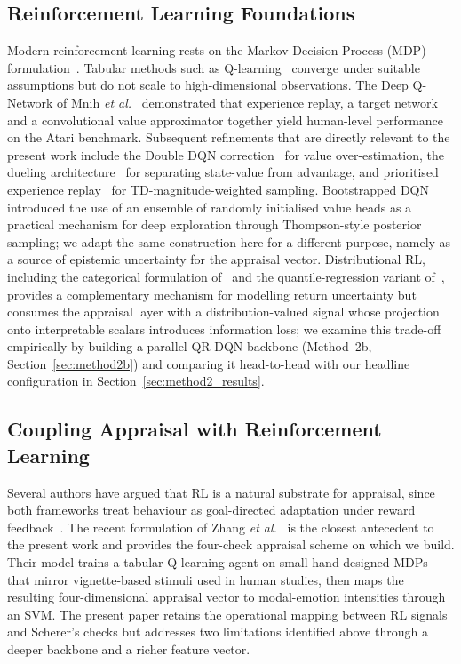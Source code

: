 \documentclass[conference]{IEEEtran}
\begin{document}
\subsection{Reinforcement Learning Foundations}
Modern reinforcement learning rests on the Markov Decision Process (MDP)
formulation~\cite{sutton2018reinforcement}. Tabular methods such as
Q-learning~\cite{watkins1992qlearning} converge under suitable assumptions but
do not scale to high-dimensional observations. The Deep Q-Network of Mnih
\textit{et al.}~\cite{mnih2015human} demonstrated that experience replay, a
target network and a convolutional value approximator together yield
human-level performance on the Atari benchmark. Subsequent refinements that are
directly relevant to the present work include the Double DQN
correction~\cite{vanhasselt2016double} for value over-estimation, the dueling
architecture~\cite{wang2016dueling} for separating state-value from advantage,
and prioritised experience replay~\cite{schaul2016prioritized} for
TD-magnitude-weighted sampling. Bootstrapped
DQN~\cite{osband2016deepexploration} introduced the use of an ensemble of
randomly initialised value heads as a practical mechanism for deep exploration
through Thompson-style posterior sampling; we adapt the same construction here
for a different purpose, namely as a source of epistemic uncertainty for the
appraisal vector. Distributional RL, including the categorical
formulation of~\cite{bellemare2017distributional} and the
quantile-regression variant of~\cite{dabney2018qrdqn}, provides a
complementary mechanism for modelling return uncertainty but consumes
the appraisal layer with a distribution-valued signal whose projection
onto interpretable scalars introduces information loss; we examine this
trade-off empirically by building a parallel QR-DQN backbone (Method~2b,
Section~\ref{sec:method2b}) and comparing it head-to-head with our
headline configuration in Section~\ref{sec:method2_results}.

\subsection{Coupling Appraisal with Reinforcement Learning}
Several authors have argued that RL is a natural substrate for appraisal,
since both frameworks treat behaviour as goal-directed adaptation under
reward feedback~\cite{moerland2018emotion,broekens2007cognitive}. The recent
formulation of Zhang \textit{et al.}~\cite{zhang2023modeling}
is the closest antecedent to the present work and provides the four-check
appraisal scheme on which we build. Their model trains a tabular Q-learning
agent on small hand-designed MDPs that mirror vignette-based stimuli used in
human studies, then maps the resulting four-dimensional appraisal vector to
modal-emotion intensities through an SVM. The present paper retains the
operational mapping between RL signals and Scherer's checks but addresses two
limitations identified above through a deeper backbone and a richer feature
vector.
\end{document}
